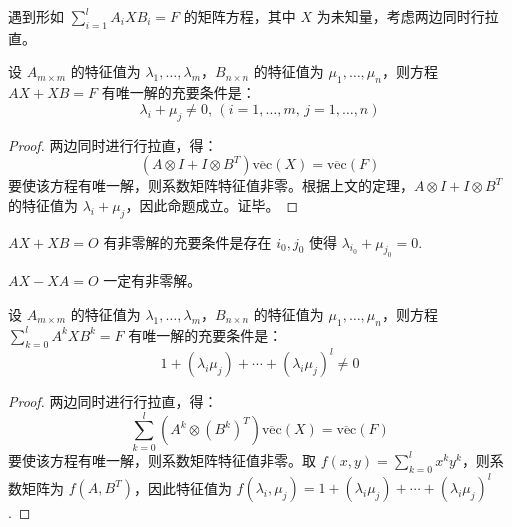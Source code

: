 \begin{remark}
遇到形如 $\displaystyle\sum_{i=1}^lA_iXB_i=F$ 的矩阵方程，其中 $X$ 为未知量，考虑两边同时行拉直。
\end{remark}

\begin{theorem}
设 $A_{m\times m}$ 的特征值为 $\lambda_1,\ldots,\lambda_m$，$B_{n\times n}$ 的特征值为 $\mu_1,\ldots,\mu_n$，则方程 $AX+XB=F$ 有唯一解的充要条件是：
\[
    \lambda_i+\mu_j\neq 0,\,(i=1,\ldots,m,\,j=1,\ldots,n)
\]
\end{theorem}
\begin{proof}
两边同时进行行拉直，得：
\[
    (A\otimes I+I\otimes B^T)\overline{\text{vec}}(X)=\overline{\text{vec}}(F)
\]
要使该方程有唯一解，则系数矩阵特征值非零。根据上文的定理，$A\otimes I+I\otimes B^T$ 的特征值为 $\lambda_i+\mu_j$，因此命题成立。证毕。
\end{proof}

\begin{corollary}
$AX+XB=O$ 有非零解的充要条件是存在 $i_0,j_0$ 使得 $\lambda_{i_0}+\mu_{j_0}=0$.
\end{corollary}

\begin{corollary}
$AX-XA=O$ 一定有非零解。
\end{corollary}

\begin{theorem}
设 $A_{m\times m}$ 的特征值为 $\lambda_1,\ldots,\lambda_m$，$B_{n\times n}$ 的特征值为 $\mu_1,\ldots,\mu_n$，则方程 $\displaystyle\sum_{k=0}^lA^kXB^k=F$ 有唯一解的充要条件是：
\[
    1+(\lambda_i\mu_j)+\cdots+(\lambda_i\mu_j)^l\neq0
\]
\end{theorem}
\begin{proof}
两边同时进行行拉直，得：
\[
    \sum_{k=0}^l\left(A^k\otimes (B^k)^T\right)\overline{\text{vec}}(X)=\overline{\text{vec}}(F)
\]
要使该方程有唯一解，则系数矩阵特征值非零。取 $f(x,y)=\displaystyle\sum_{k=0}^lx^ky^k$，则系数矩阵为 $f(A,B^T)$，因此特征值为 $f(\lambda_i,\mu_j)=1+(\lambda_i\mu_j)+\cdots+(\lambda_i\mu_j)^l$.
\end{proof}
